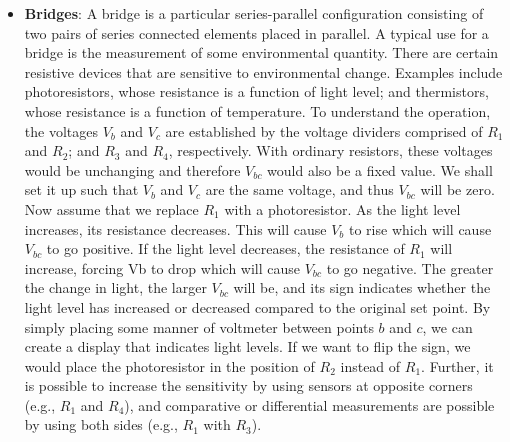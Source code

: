 \documentclass{report}
\begin{document}
\begin{itemize}
        \item \textbf{Bridges}: A bridge is a particular series-parallel configuration consisting of two pairs of series connected elements placed in parallel. 
            \bigbreak \noindent 
            \bigbreak \noindent 
            A typical use for a bridge is the measurement of some environmental quantity. There are certain resistive devices that are sensitive to environmental change. Examples include photoresistors, whose resistance is a function of light level; and thermistors, whose resistance is a function of temperature.
            \bigbreak \noindent 
            To understand the operation, the voltages $V_{b}$ and $V_{c}$ are established by the voltage dividers comprised of $R_1$ and $R_2$; and $R_3$ and $R_4$, respectively. With ordinary resistors, these voltages would be unchanging and therefore $V_{bc}$ would also be a fixed value. We shall set it up such that $V_{b}$ and $V_{c}$ are the same voltage, and thus $V_{bc}$ will be zero. Now assume that we replace $R_1$ with a photoresistor. As the light level increases, its resistance decreases. This will cause $V_{b}$ to rise which will cause $V_{bc}$ to go positive. If the light level decreases, the resistance of $R_1$ will increase, forcing Vb to drop which will cause $V_{bc}$ to go negative. The greater the change in light, the larger $V_{bc}$ will be, and its sign indicates whether the light level has increased or decreased compared to the original set point. By simply placing some manner of voltmeter between points $b$ and $c$, we can create a display that indicates light levels.
            \bigbreak \noindent 
            If we want to flip the sign, we would place the photoresistor in the position of $R_2$ instead of $R_1$. Further, it is possible to increase the sensitivity by using sensors at opposite corners (e.g., $R_1$ and $R_4$), and comparative or differential measurements are possible by using both sides (e.g., $R_1$ with $R_3$).


    \end{itemize}

    \pagebreak 
    \begin{itemize}
                



    \end{itemize}





    
\end{document}
